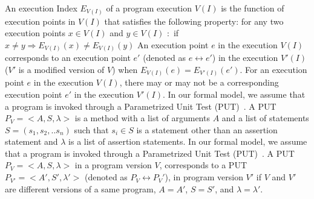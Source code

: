 {
An execution Index $E_{V(I)}$ of a program execution $V(I)$ is the function of execution points in 
$V(I)$ that satisfies the following property:
for any two execution points $x \in V(I)$ and $y \in V(I)$ $:$ if $x \neq y \Rightarrow E_{V(I)}(x) \neq E_{V(I)}(y) $
}
\vspace{-0.3cm}
{
An execution point $e$ in the execution $V(I)$ corresponds to an
execution point $e'$ (denoted as $e \leftrightarrow e'$) in the execution $V'(I)$ 
($V'$ is a modified version of $V$) when $E_{V(I)}(e) = E_{V'(I)}(e')$.
For an execution point $e$ in the execution $V(I)$, there may or may not be a
corresponding execution point $e'$ in the execution $V'(I)$.
}
\vspace{-0.3cm}
{
In our formal model, we assume that a program is invoked through a 
Parametrized Unit Test (PUT)~\cite{tillmann05:parameterized}. 
A PUT $P_V =  <A, S, \lambda> $ is a method with a list of arguments $A$
and a list of statements $S=(s_1, s_2, ..s_n)$
such that $s_i \in S$ is a statement other than an assertion statement and $\lambda$ is a list of assertion statements. 
}
\vspace{-0.3cm}
{
In our formal model, we assume that a program is invoked through a 
Parametrized Unit Test (PUT)~\cite{tillmann05:parameterized}. 
A PUT $P_V = <A, S, \lambda>$ in a program version $V$, corresponds to a PUT $P_{V'} = <A', S', \lambda'>$ (denoted as $P_V \leftrightarrow P_V'$), in program version $V'$ if
$V$ and $V'$ are different versions of a same program, $A = A'$, $S = S'$, and $\lambda = \lambda'$.
}


